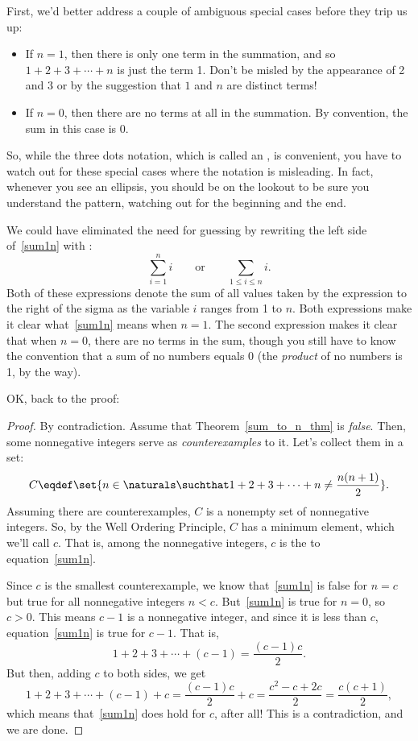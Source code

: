 First, we'd better address a couple of ambiguous special
cases before they trip us up:
\begin{itemize}
\item If $n = 1$, then there is only one term in the summation, and so $1
  + 2 + 3 + \cdots + n$ is just the term 1.  Don't be misled by the
  appearance of 2 and 3 or by the suggestion that $1$ and $n$ are distinct
  terms!
\item If $n = 0$, then there are no terms at all in the summation.  By
convention, the sum in this case is 0.
\end{itemize}
So, while the three dots notation, which is called an ,
is convenient, you have to watch out for these special cases where the
notation is misleading.  In fact, whenever you see an ellipsis, you
should be on the lookout to be sure you understand the pattern,
watching out for the beginning and the end.

We could have eliminated the need for guessing by rewriting the left side
of~\eqref{sum1n} with :
\[
\sum_{i=1}^n i
\qquad \text{or} \qquad
\sum_{1 \leq i \leq n} i.
\]
Both of these expressions denote the sum of all values taken by the
expression to the right of the sigma as the variable $i$ ranges from
1 to $n$.  Both expressions make it clear what~\eqref{sum1n} means
when $n=1$.  The second expression makes it clear that when $n=0$,
there are no terms in the sum, though you still have to know the
convention that a sum of no numbers equals 0 (the \emph{product} of no
numbers is 1, by the way).

OK, back to the proof:
\begin{proof}
By contradiction.  Assume that Theorem~\ref{sum_to_n_thm} is
\emph{false}.  Then, some nonnegative integers serve as
\emph{counterexamples} to it. Let's collect them in a set:
\[
C \eqdef \set{n\in\naturals \suchthat 
        1 + 2 + 3 + \cdots + n \neq \frac{n(n+1)}{2}}.
\]
Assuming there are counterexamples, $C$ is a nonempty set of
nonnegative integers.  So, by the Well Ordering Principle, $C$ has a
minimum element, which we'll call $c$.  That is, among the nonnegative
integers, $c$ is the \emph{} to
equation~\eqref{sum1n}.

Since $c$ is the smallest counterexample, we know that~\eqref{sum1n} is
false for $n=c$ but true for all nonnegative integers $n<c$.
But~\eqref{sum1n} is true for $n=0$, so $c > 0$.  This means $c-1$ is a
nonnegative integer, and since it is less than $c$, equation~\eqref{sum1n}
is true for $c-1$.  That is,
\[
        1 + 2 + 3 + \cdots + (c-1) = \frac{(c-1)c}{2}.
\]
But then, adding $c$ to both sides, we get
\[
1 + 2 + 3 + \cdots + (c-1) + c 
        = \frac{(c-1)c}{2} + c
        = \frac{c^2 - c + 2c}{2} 
        = \frac{c(c+1)}{2},
\]
which means that~\eqref{sum1n} does hold for $c$, after all!  This is a
contradiction, and we are done.
\end{proof}


